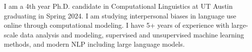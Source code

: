 I am a 4th year Ph.D. candidate in Computational Linguistics at UT Austin graduating in Spring 2024. I am studying interpersonal biases in language use online through computational modeling. I have 5+ years of experience with large-scale data analysis and modeling, supervised and unsupervised machine learning methods, and modern NLP  including large language models.

%
